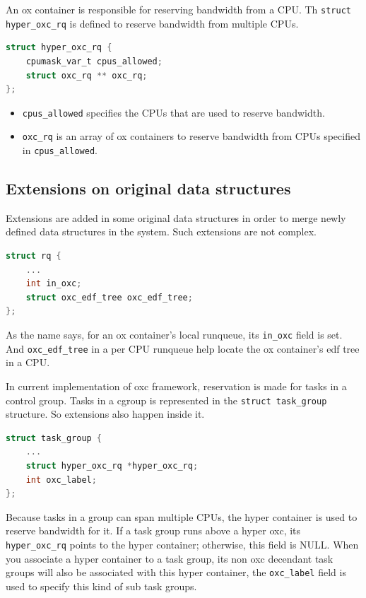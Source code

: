An ox container is responsible for reserving bandwidth from a CPU.
Th \texttt{struct hyper\_oxc\_rq} is defined to reserve bandwidth from
multiple CPUs. 
\begin{lstlisting}[language=C]
struct hyper_oxc_rq {
	cpumask_var_t cpus_allowed;
	struct oxc_rq ** oxc_rq;
};
\end{lstlisting}
\begin{itemize}
\item \texttt{cpus\_allowed} specifies the CPUs that are used to reserve 
				bandwidth.
\item \texttt{oxc\_rq} is an array of ox containers to reserve bandwidth 			
		from CPUs specified in \texttt{cpus\_allowed}.
\end{itemize}

\subsection{Extensions on original data structures}
Extensions are added in some original data structures in order to merge
newly defined data structures in the system. Such extensions are not complex.
\begin{lstlisting}[language=C, caption={Extensions in \texttt{struct rq}}]
struct rq {
	...
	int in_oxc;
	struct oxc_edf_tree oxc_edf_tree;
};
\end{lstlisting}
As the name says, for an ox container's local runqueue, its 
\texttt{in\_oxc} field is set. And \texttt{oxc\_edf\_tree} in a 
per CPU runqueue help locate the ox container's edf tree in a CPU.

In current implementation of oxc framework, reservation is made for 
tasks in a control group. Tasks in a cgroup is represented in the
\texttt{struct task\_group} structure. So extensions also happen inside it.
\begin{lstlisting}[language=C, caption={Extensions in 
						\texttt{struct task\_group}}]
struct task_group {
	...
	struct hyper_oxc_rq *hyper_oxc_rq;
	int oxc_label;
};
\end{lstlisting}
Because tasks in a group can span multiple CPUs, the hyper container is
used to reserve bandwidth for it.
If a task group runs above a hyper oxc, its \texttt{hyper\_oxc\_rq} points 
to the hyper container; otherwise, this field is NULL.
When you associate a hyper container to a task group, its non oxc decendant 
task groups will also be associated with this hyper container, the 
\texttt{oxc\_label} field is used to specify this kind of sub task groups.

